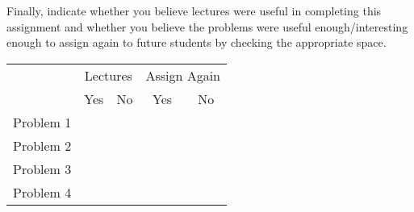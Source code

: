 \documentclass[11pt,letterpaper]{article}
\begin{document}
Finally, indicate whether you believe lectures were useful in completing this assignment and whether you believe the problems were useful enough/interesting enough to assign again to future students by checking the appropriate space.

\vspace{0.25cm}
\begin{center}
\begin{tabular}{c||c|c|c|c|}
  & \multicolumn{2}{c|}{Lectures} &  \multicolumn{2}{c|}{Assign Again} \\ \cline{2-5}
   & Yes & No & Yes & No \\ \hline \hline
  Problem 1 &  &  &  &  \\ \hline 
  Problem 2 &  &  &  &  \\ \hline 
  Problem 3 &  &  &  &  \\ \hline 
  Problem 4 &  &  &  &  
\end{tabular}
\end{center}
\end{document}
